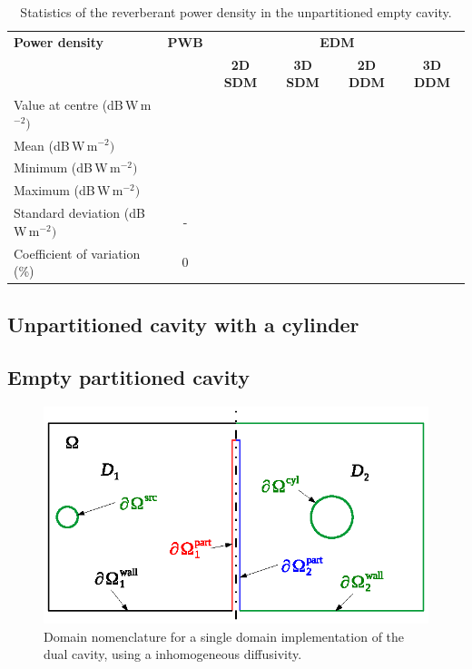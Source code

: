 \documentclass[a4paper]{article}
\numberwithin{equation}{section}
\begin{document}
\begin{table}[ht]
\begin{center}
\begin{tabular}{|l|c|c|c|c|c|}
\hline
\textbf{Power density}               &\textbf{PWB} &\multicolumn{4}{|c|}{\textbf{EDM}} \\ \cline{3-6}
{}                                   &{}           &\textbf{2D SDM} &\textbf{3D SDM} &\textbf{2D DDM} &\textbf{3D DDM} \\
\hline
Value at centre (dB\,W\,m$^{-2})$    &{}           &{}              &{}              &{}              &{} \\
Mean (dB\,W\,m$^{-2})$               &{}           &{}              &{}              &{}              &{} \\
Minimum (dB\,W\,m$^{-2})$            &{}           &{}              &{}              &{}              &{} \\
Maximum (dB\,W\,m$^{-2})$            &{}           &{}              &{}              &{}              &{} \\
Standard deviation (dB\,W\,m$^{-2})$ &-            &{}              &{}              &{}              &{} \\
Coefficient of variation (\%)        &0            &{}              &{}              &{}              &{} \\
\hline
\end{tabular}
\end{center}
\caption{\label{tb:emptyunpart} Statistics of the reverberant power density in the unpartitioned empty cavity.}
\end{table}

\subsection[Unpartitioned cavity with a cylinder]{Unpartitioned cavity with a cylinder}
\label{sc:tcs:cylunpart}

\subsection[Empty partitioned cavity]{Empty partitioned cavity}
\label{sc:tcs:emptypart}

\begin{figure}[ht]
\begin{center}
\includegraphics[width=0.6\linewidth]{figures/domains1}
\vspace{-4mm}
\caption{\label{fg:tcdom1} Domain nomenclature for a single domain implementation of the dual cavity, using
a inhomogeneous diffusivity.}
\end{center}
\end{figure}
\end{document}
